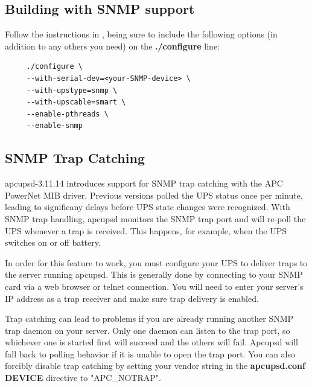 {{{{{{{{{\subsection*{Building with SNMP support}

Follow the instructions in 
,
being sure to include the following options (in addition to any others you need) on the
{\bf ./configure} line: 

\footnotesize
\begin{verbatim}
     ./configure \
     --with-serial-dev=<your-SNMP-device> \
     --with-upstype=snmp \
     --with-upscable=smart \
     --enable-pthreads \
     --enable-snmp
\end{verbatim}
\normalsize

\label{SNMP-Trap-Catching}
\subsection*{SNMP Trap Catching}

apcupsd-3.11.14 introduces support for SNMP trap catching with the APC
PowerNet MIB driver. Previous versions polled the UPS status once per minute, 
leading to significany delays before UPS state changes were recognized. With 
SNMP trap handling, apcupsd monitors the SNMP trap port and will re-poll the
UPS whenever a trap is received. This happens, for example, when the UPS 
switches on or off battery.

In order for this feature to work, you must configure your UPS to
deliver traps to the server running apcupsd. This is generally done by 
connecting to your SNMP card via a web browser or telnet connection. You
will need to enter your server's IP address as a trap receiver and make sure
trap delivery is enabled.

Trap catching can lead to problems if you are already running another SNMP
trap daemon on your server. Only one daemon can listen to the trap port, so
whichever one is started first will succeed and the others will fail. Apcupsd
will fall back to polling behavior if it is unable to open the trap port. You
can also forcibly disable trap catching by setting your vendor string in the
{\bf apcupsd.conf} {\bf DEVICE} directive to "APC\_NOTRAP".

}}}}}}}}}
